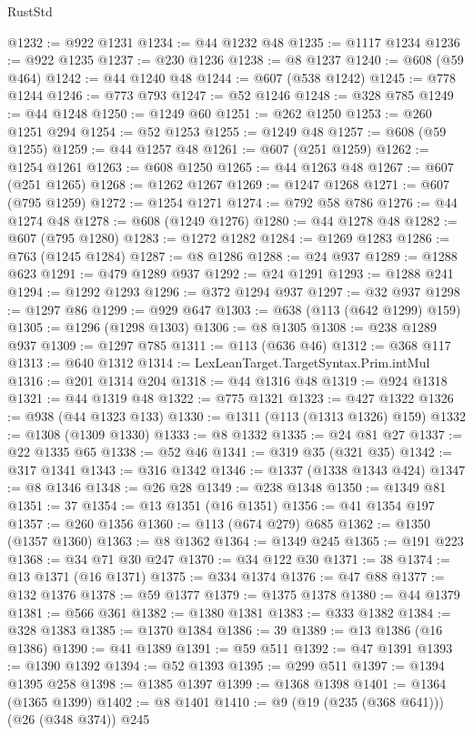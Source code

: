 \begin{lexlean}{RustStd}
\begin{coremodule}
@1232 := @922 @1231
@1234 := @44 @1232 @48
@1235 := @1117 @1234
@1236 := @922 @1235
@1237 := @230 @1236
@1238 := @8 @1237
@1240 := @608 (@59 @464)
@1242 := @44 @1240 @48
@1244 := @607 (@538 @1242)
@1245 := @778 @1244
@1246 := @773 @793
@1247 := @52 @1246
@1248 := @328 @785
@1249 := @44 @1248
@1250 := @1249 @60
@1251 := @262 @1250
@1253 := @260 @1251 @294
@1254 := @52 @1253
@1255 := @1249 @48
@1257 := @608 (@59 @1255)
@1259 := @44 @1257 @48
@1261 := @607 (@251 @1259)
@1262 := @1254 @1261
@1263 := @608 @1250
@1265 := @44 @1263 @48
@1267 := @607 (@251 @1265)
@1268 := @1262 @1267
@1269 := @1247 @1268
@1271 := @607 (@795 @1259)
@1272 := @1254 @1271
@1274 := @792 @58 @786
@1276 := @44 @1274 @48
@1278 := @608 (@1249 @1276)
@1280 := @44 @1278 @48
@1282 := @607 (@795 @1280)
@1283 := @1272 @1282
@1284 := @1269 @1283
@1286 := @763 (@1245 @1284)
@1287 := @8 @1286
@1288 := @24 @937
@1289 := @1288 @623
@1291 := @479 @1289 @937
@1292 := @24 @1291
@1293 := @1288 @241
@1294 := @1292 @1293
@1296 := @372 @1294 @937
@1297 := @32 @937
@1298 := @1297 @86
@1299 := @929 @647
@1303 := @638 (@113 (@642 @1299) @159)
@1305 := @1296 (@1298 @1303)
@1306 := @8 @1305
@1308 := @238 @1289 @937
@1309 := @1297 @785
@1311 := @113 (@636 @46)
@1312 := @368 @117
@1313 := @640 @1312
@1314 := LexLeanTarget.TargetSyntax.Prim.intMul
@1316 := @201 @1314 @204
@1318 := @44 @1316 @48
@1319 := @924 @1318
@1321 := @44 @1319 @48
@1322 := @775 @1321
@1323 := @427 @1322
@1326 := @938 (@44 @1323 @133)
@1330 := @1311 (@113 (@1313 @1326) @159)
@1332 := @1308 (@1309 @1330)
@1333 := @8 @1332
@1335 := @24 @81 @27
@1337 := @22 @1335 @65
@1338 := @52 @46
@1341 := @319 @35 (@321 @35)
@1342 := @317 @1341
@1343 := @316 @1342
@1346 := @1337 (@1338 @1343 @424)
@1347 := @8 @1346
@1348 := @26 @28
@1349 := @238 @1348
@1350 := @1349 @81
@1351 := 37
@1354 := @13 @1351 (@16 @1351)
@1356 := @41 @1354 @197
@1357 := @260 @1356
@1360 := @113 (@674 @279) @685
@1362 := @1350 (@1357 @1360)
@1363 := @8 @1362
@1364 := @1349 @245
@1365 := @191 @223
@1368 := @34 @71 @30 @247
@1370 := @34 @122 @30
@1371 := 38
@1374 := @13 @1371 (@16 @1371)
@1375 := @334 @1374
@1376 := @47 @88
@1377 := @132 @1376
@1378 := @59 @1377
@1379 := @1375 @1378
@1380 := @44 @1379
@1381 := @566 @361
@1382 := @1380 @1381
@1383 := @333 @1382
@1384 := @328 @1383
@1385 := @1370 @1384
@1386 := 39
@1389 := @13 @1386 (@16 @1386)
@1390 := @41 @1389
@1391 := @59 @511
@1392 := @47 @1391
@1393 := @1390 @1392
@1394 := @52 @1393
@1395 := @299 @511
@1397 := @1394 @1395 @258
@1398 := @1385 @1397
@1399 := @1368 @1398
@1401 := @1364 (@1365 @1399)
@1402 := @8 @1401
@1410 := @9 (@19 (@235 (@368 @641))) (@26 (@348 @374)) @245

\end{coremodule}
\end{lexlean}
